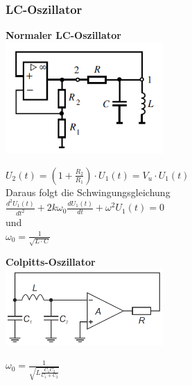 	\subsubsection{LC-Oszillator}
		\begin{multicols}{2}
			\textbf{Normaler LC-Oszillator} \\
			\includegraphics[width=6cm]{images/lcOszillator}
			
		\columnbreak
			$U_2(t) = (1+\frac{R_2}{R_1}) \cdot U_1(t) = V_u \cdot U_1(t)$ \\
			
			Daraus folgt die Schwingungsgleichung \\
			$\frac{d^2 U_1(t)}{dt^2}+2k\omega_0 \frac{dU_1(t)}{dt}+\omega^2U_1(t)=0$ \\
			
			und \\
			$\omega_0 = \frac{1}{\sqrt{L\cdot C}}$
		\end{multicols}
		
		\begin{multicols}{2}
			\textbf{Colpitts-Oszillator}\\
			\includegraphics[width=6cm]{images/osziLC.png}\\
			
		\columnbreak
		
			$\omega_0=\frac{1}{\sqrt{L\frac{C_1 C_2}{C_1+C_2}}}$\\
			
		\end{multicols}

